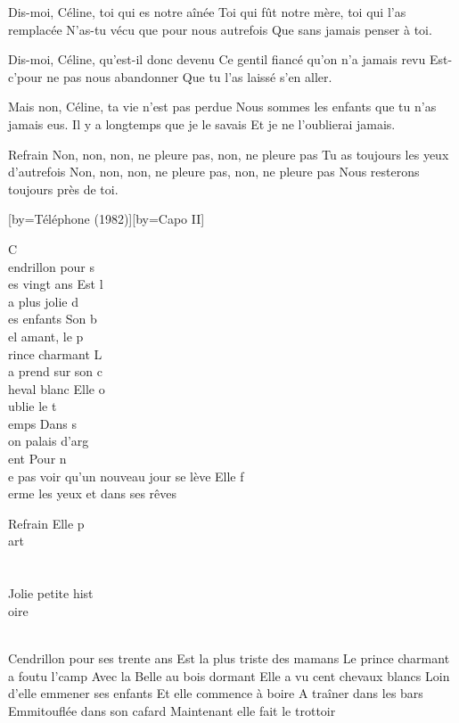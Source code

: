 \beginverse
Dis-moi, Céline, toi qui es notre aînée
Toi qui fût notre mère, toi qui l'as remplacée
N'as-tu vécu que pour nous autrefois
Que sans jamais penser à toi.
\endverse

\beginverse
Dis-moi, Céline, qu'est-il donc devenu 
Ce gentil fiancé qu'on n'a jamais revu 
Est-c'pour ne pas nous abandonner
Que tu l'as laissé s'en aller.
\endverse

\beginverse
Mais non, Céline, ta vie n'est pas perdue
Nous sommes les enfants que tu n'as jamais eus.
Il y a longtemps que je le savais 
Et je ne l'oublierai jamais.
\endverse

	Refrain
Non, non, non, ne pleure pas, non, ne pleure pas
Tu as toujours les yeux d'autrefois
Non, non, non, ne pleure pas, non, ne pleure pas
Nous resterons toujours près de toi.

[by={Téléphone (1982)}][by={Capo II}]

\beginverse
C\\[Sol]endrillon pour s\\[Ré]es vingt ans
Est l\\[Mim]a plus jolie d\\[Do]es enfants
Son b\\[Sol]el amant, le p\\[Ré]rince charmant
L\\[Mim]a prend sur son c\\[Do]heval blanc
Elle o\\[Ré]ublie le t\\[Sol]emps
Dans s\\[Ré]on palais d'arg\\[Mim]ent
Pour n\\[Lam]e pas voir qu'un nouveau jour se lève
Elle f\\[Do]erme les yeux et dans ses rêves
\endverse

\beginverse
Refrain
Elle p\\[Sol]art \\[Ré] \\[Mim]
\\[Do]Jolie petite hist\\[Sol]oire \\[Ré] \\[Mim]
\endverse

\beginverse
Cendrillon pour ses trente ans
Est la plus triste des mamans
Le prince charmant a foutu l'camp
Avec la Belle au bois dormant
Elle a vu cent chevaux blancs
Loin d'elle emmener ses enfants
Et elle commence à boire
A traîner dans les bars
Emmitouflée dans son cafard
Maintenant elle fait le trottoir
\endverse

